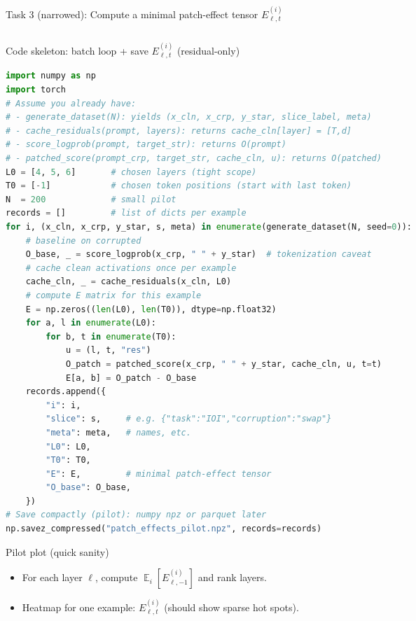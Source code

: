 \documentclass[aspectratio=169,xcolor={dvipsnames}]{beamer}
\DeclareMathOperator{\Exp}{\mathbb{E}}
\begin{document}
\begin{frame}[fragile,shrink=44]{Task 3 (narrowed): Compute a minimal patch-effect tensor $E^{(i)}_{\ell,t}$}
\begin{columns}[T,onlytextwidth]
\begin{column}{0.48\textwidth}
\begin{block}{Code skeleton: batch loop + save $E^{(i)}_{\ell,t}$ (residual-only)}
\footnotesize
\begin{lstlisting}[language=Python,basicstyle=\ttfamily\scriptsize]
import numpy as np
import torch
# Assume you already have:
# - generate_dataset(N): yields (x_cln, x_crp, y_star, slice_label, meta)
# - cache_residuals(prompt, layers): returns cache_cln[layer] = [T,d]
# - score_logprob(prompt, target_str): returns O(prompt)
# - patched_score(prompt_crp, target_str, cache_cln, u): returns O(patched)
L0 = [4, 5, 6]       # chosen layers (tight scope)
T0 = [-1]            # chosen token positions (start with last token)
N  = 200             # small pilot
records = []         # list of dicts per example
for i, (x_cln, x_crp, y_star, s, meta) in enumerate(generate_dataset(N, seed=0)):
    # baseline on corrupted
    O_base, _ = score_logprob(x_crp, " " + y_star)  # tokenization caveat
    # cache clean activations once per example
    cache_cln, _ = cache_residuals(x_cln, L0)
    # compute E matrix for this example
    E = np.zeros((len(L0), len(T0)), dtype=np.float32)
    for a, l in enumerate(L0):
        for b, t in enumerate(T0):
            u = (l, t, "res")
            O_patch = patched_score(x_crp, " " + y_star, cache_cln, u, t=t)
            E[a, b] = O_patch - O_base
    records.append({
        "i": i,
        "slice": s,     # e.g. {"task":"IOI","corruption":"swap"}
        "meta": meta,   # names, etc.
        "L0": L0,
        "T0": T0,
        "E": E,         # minimal patch-effect tensor
        "O_base": O_base,
    })
# Save compactly (pilot): numpy npz or parquet later
np.savez_compressed("patch_effects_pilot.npz", records=records)
\end{lstlisting}
\end{block}

\vspace{1mm}
\begin{block}{Pilot plot (quick sanity)}
\footnotesize
\begin{itemize}\setlength\itemsep{2pt}
\item For each layer $\ell$, compute $\Exp_i[E^{(i)}_{\ell,-1}]$ and rank layers.
\item Heatmap for one example: $E^{(i)}_{\ell,t}$ (should show sparse hot spots).
\end{itemize}
\end{block}
\end{column}
\end{columns}
\end{frame}
\end{document}
